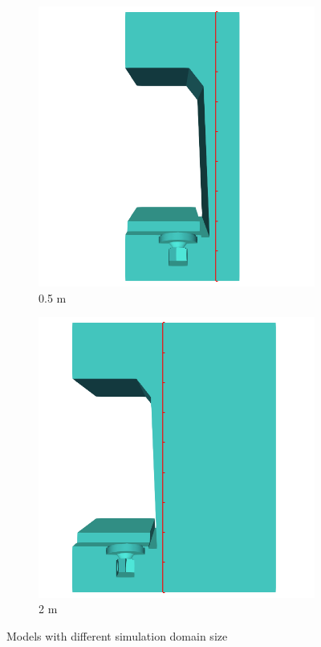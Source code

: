 \begin{figure}[H]
	\centering
	\begin{subfigure}[b]{0.45\textwidth}
		\centering
		\includegraphics[width=\linewidth]{fig/chap4/simulation_domain/0pt5m.png}
		\caption{0.5 m}
	\end{subfigure}
	\hfill
	\begin{subfigure}[b]{0.45\textwidth}
		\centering
		\includegraphics[width=\linewidth]{fig/chap4/simulation_domain/2m.png}
		\caption{2 m}
	\end{subfigure}
	\caption{Models with different simulation domain size}
\end{figure}



